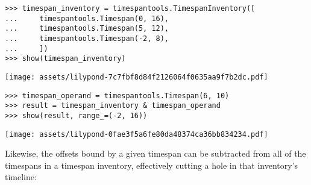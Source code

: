 \begin{comment}
<abjad>
timespan_inventory = timespantools.TimespanInventory([
    timespantools.Timespan(0, 16),
    timespantools.Timespan(5, 12),
    timespantools.Timespan(-2, 8),
    ])
show(timespan_inventory)
timespan_operand = timespantools.Timespan(6, 10)
result = timespan_inventory & timespan_operand
show(result, range_=(-2, 16))
</abjad>
\end{comment}

\begin{abjadbookoutput}
\begin{singlespacing}
\vspace{-0.5\baselineskip}
\begin{verbatim}
>>> timespan_inventory = timespantools.TimespanInventory([
...     timespantools.Timespan(0, 16),
...     timespantools.Timespan(5, 12),
...     timespantools.Timespan(-2, 8),
...     ])
>>> show(timespan_inventory)
\end{verbatim}
\noindent\texttt{[image: assets/lilypond-7c7fbf8d84f2126064f0635aa9f7b2dc.pdf]}
\begin{verbatim}
>>> timespan_operand = timespantools.Timespan(6, 10)
>>> result = timespan_inventory & timespan_operand
>>> show(result, range_=(-2, 16))
\end{verbatim}
\noindent\texttt{[image: assets/lilypond-0fae3f5a6fe80da48374ca36bb834234.pdf]}
\end{singlespacing}
\end{abjadbookoutput}

\noindent Likewise, the offsets bound by a given timespan can be subtracted
from all of the timespans in a timespan inventory, effectively cutting a hole
in that inventory's timeline:

\begin{comment}
<abjad>
timespan_inventory = timespantools.TimespanInventory([
    timespantools.Timespan(0, 16),
    timespantools.Timespan(5, 12),
    timespantools.Timespan(-2, 8),
    ])
show(timespan_inventory)
timespan_operand = timespantools.Timespan(6, 10)
result = timespan_inventory - timespan_operand
show(result)
</abjad>
\end{comment}


